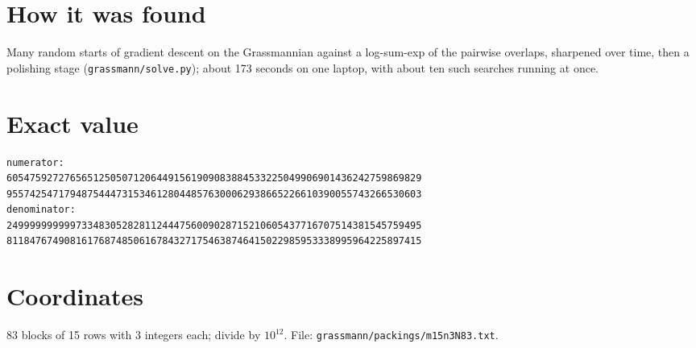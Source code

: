 \documentclass[11pt,a4paper]{article}
\begin{document}
\section{How it was found}
Many random starts of gradient descent on the Grassmannian against a log-sum-exp of the pairwise overlaps, sharpened over time, then a polishing stage (\texttt{grassmann/solve.py}); about 173 seconds on one laptop, with about ten such searches running at once.


\appendix
\section{Exact value}
{\small
\begin{verbatim}
numerator:
605475927276565125050712064491561909083884533225049906901436242759869829
955742547179487544473153461280448576300062938665226610390055743266530603
denominator:
249999999999733483052828112444756009028715210605437716707514381545759495
811847674908161768748506167843271754638746415022985953338995964225897415
\end{verbatim}}

\section{Coordinates}
83 blocks of 15 rows with 3 integers each; divide by $10^{12}$. File: \texttt{grassmann/packings/m15n3N83.txt}.
{\tiny
\begin{multicols}{3}
\end{multicols}}
\end{document}
